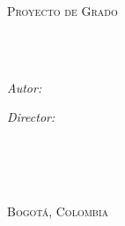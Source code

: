 \documentclass[
11pt, %
oneside, %
spanish, %
singlespacing, %
headsepline, %
]{MastersDoctoralThesis} %
\author{Alejandro \textsc{Anzola \'Avila}} %
\begin{document}
\frontmatter %

\pagestyle{plain} %


\begin{titlepage}
\begin{center}

\vspace*{.06\textheight}
{\scshape\LARGE \univname\par}\vspace{1.5cm} %
\textsc{\Large Proyecto de Grado}\\[0.5cm] %

\HRule \\[0.4cm] %
{\huge \bfseries \ttitle\par}\vspace{0.4cm} %
\HRule \\[1.5cm] %
 
\begin{minipage}[t]{0.4\textwidth}
\begin{flushleft} \large
\emph{Autor:}\\
\href{https://www.linkedin.com/in/alejandro-anzola-avila/}{\authorname} %
\end{flushleft}
\end{minipage}
\begin{minipage}[t]{0.45\textwidth}
\begin{flushright} \large
\emph{Director:} \\
\href{https://dodiazlopez.github.io/main/}{\supname} %
\end{flushright}
\end{minipage}\\[3cm]
 
\vfill

\groupname\\\deptname\\[0.5cm] %
\textsc{Bogot\'a, Colombia}\\[1cm]
 

\end{center}
\end{titlepage}
\end{document}

